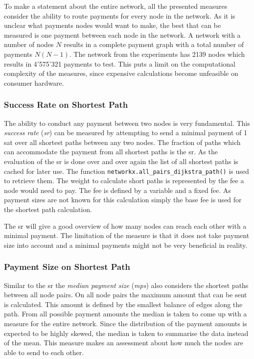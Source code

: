 \documentclass[final]{fhnwreport}       %
\begin{document}
To make a statement about the entire network, all the presented measures consider the ability to route payments for every node in the network. As it is unclear what payments nodes would want to make, the best that  can be measured is one payment between each node in the network. A network with a number of nodes $N$ results in a complete payment graph with a total number of payments $N(N-1)$. The network from the experiments has 2139 nodes which results in 4'575'321 payments to test. This puts a limit on the computational complexity of the measures, since expensive calculations become unfeasible on consumer hardware.

\subsubsection{Success Rate on Shortest Path}
The ability to conduct any payment between two nodes is very fundamental. This \emph{success rate} (\emph{\gls{sr}}) can be measured by attempting to send a minimal payment of 1 sat over all shortest paths between any two nodes. The fraction of paths which can accommodate the payment from all shortest paths is the \gls{sr}. As the evaluation of the \gls{sr} is done over and over again the list of all shortest paths is cached for later use. The function \texttt{networkx.all_pairs_dijkstra_path()} is used to retrieve them. The weight to calculate short paths is represented by the fee a node would need to pay. The fee is defined by a variable and a fixed fee. As payment sizes are not known for this calculation simply the base fee is used for the shortest path calculation. 

The \gls{sr} will give a good overview of how many nodes can reach each other with a minimal payment. The limitation of the measure is that it does not take payment size into account and a minimal payments might not be very beneficial in reality.


\subsubsection{Payment Size on Shortest Path}
Similar to the \gls{sr} the \emph{median payment size} (\emph{\gls{mps}}) also considers the shortest paths between all node pairs. On all node pairs the maximum amount that can be sent is calculated. This amount is defined by the smallest balance of edges along the path. From all possible payment amounts the median is taken to come up with a measure for the entire network. Since the distribution of the payment amounts is expected to be highly skewed, the median is taken to summarise the data instead of the mean. This measure makes an assessment about how much the nodes are able to send to each other.
\end{document}
